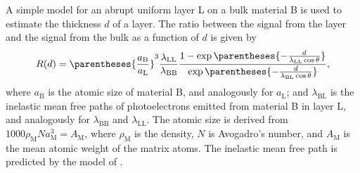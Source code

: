 A simple model for an abrupt uniform layer L on a bulk material B is used to estimate the thickness $d$ of a layer. The ratio between the signal from the layer and the signal from the bulk as a function of $d$ is given by \citep{briggs1990practical} 
\begin{equation}\label{eq:signal_ratio}
    R(d) = \parentheses{\frac{a_\mathrm{B}}{a_\mathrm{L}}}^3 \frac{\lambda_\mathrm{LL}}{\lambda_\mathrm{BB}} \frac{1-\exp{\parentheses{-\frac{d}{\lambda_\mathrm{LL}\cos\theta}}}}{\exp{\parentheses{-\frac{d}{\lambda_\mathrm{BL}\cos\theta}}}},
\end{equation}
where $a_\mathrm{B}$ is the atomic size of material B, and analogously for $a_\mathrm{L}$; and $\lambda_\mathrm{BL}$ is the inelastic mean free paths of photoelectrons emitted from material B in layer L, and analogously for $\lambda_\mathrm{BB}$ and $\lambda_\mathrm{LL}$. The atomic size is derived from $1000\rho_\mathrm{M}N a_\mathrm{M}^3 = A_\mathrm{M}$, where $\rho_\mathrm{M}$ is the density, $N$ is Avogadro's number, and $A_\mathrm{M}$ is the mean atomic weight of the matrix atoms. The inelastic mean free path is predicted by the model of \citet{tanuma1991calculations}.




